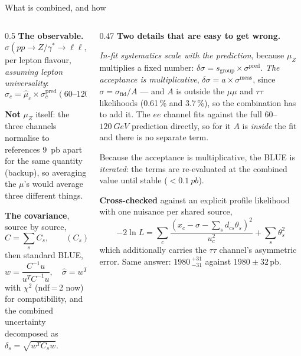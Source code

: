 \documentclass[aspectratio=169,9pt,t]{beamer}
\newcommand{\Z}{\ensuremath{Z/\gamma^{*}}}
\newcommand{\muZ}{\ensuremath{\mu_{Z}}}
\newcommand{\ee}{\ensuremath{ee}}
\newcommand{\mll}{\ensuremath{m_{\ell\ell}}}
\newcommand{\pb}{\ensuremath{\,\mathrm{pb}}}
\newcommand{\sigll}{\ensuremath{\sigma(pp\to\Z\to\ell\ell,\ 60<\mll<120\,\mathrm{GeV})}}
\begin{document}
\begin{frame}{What is combined, and how}
\begin{columns}[T]
\begin{column}{0.5\textwidth}\small
\textbf{The observable.} $\sigll$ per lepton flavour, \emph{assuming lepton universality}:
\[ \sigma_{c} = \hat\mu_{c}\times\sigma^{\text{pred}}_{c}(60\text{--}120) \]

\textbf{Not} $\muZ$ itself: the three channels normalise to references \SI{9}{pb} apart for the
same quantity (backup), so averaging the $\mu$'s would average three different things.

\medskip
\textbf{The covariance}, source by source,
\[ C = \sum_{s} C_{s},\qquad (C_{s})_{ij} = \rho_{s}\,s_{i}s_{j} \]
then standard BLUE,
\[ w = \frac{C^{-1}u}{u^{T}C^{-1}u},\quad \hat\sigma = w^{T}x,\quad
   \mathrm{Var} = \frac{1}{u^{T}C^{-1}u} \]
with $\chi^{2}$ (ndf\,=\,2 now) for compatibility, and the combined uncertainty decomposed as
$\delta_{s} = \sqrt{w^{T}C_{s}w}$.
\end{column}

\begin{column}{0.47\textwidth}\small
\textbf{Two details that are easy to get wrong.}

\smallskip
\emph{In-fit systematics scale with the prediction}, because \muZ{} multiplies a fixed number:
$\delta\sigma = s_{\text{group}}\times\sigma^{\text{pred}}$. \emph{The acceptance is
multiplicative}, $\delta\sigma = a\times\sigma^{\text{meas}}$, since $\sigma = \sigma_{\text{fid}}/A$
--- and $A$ is outside the $\mu\mu$ and $\tau\tau$ likelihoods (0.61\,\% and 3.7\,\%), so the
combination has to add it. The $\ee$ channel fits against the full $60$--$\SI{120}{GeV}$
prediction directly, so for it $A$ is \emph{inside} the fit and there is no separate term.

\smallskip
Because the acceptance is multiplicative, the BLUE is \emph{iterated}: the terms are re-evaluated
at the combined value until stable ($<\SI{0.1}{pb}$).

\medskip
\textbf{Cross-checked} against an explicit profile likelihood with one nuisance per shared source,
\[ -2\ln L = \sum_{c}\frac{(x_{c}-\sigma-\sum_{s}d_{cs}\theta_{s})^{2}}{u_{c}^{2}}
   + \sum_{s}\theta_{s}^{2} \]
which additionally carries the $\tau\tau$ channel's asymmetric error. Same answer:
$1980\,^{+31}_{-31}$ against $1980 \pm 32\pb$.
\end{column}
\end{columns}
\end{frame}
\end{document}
